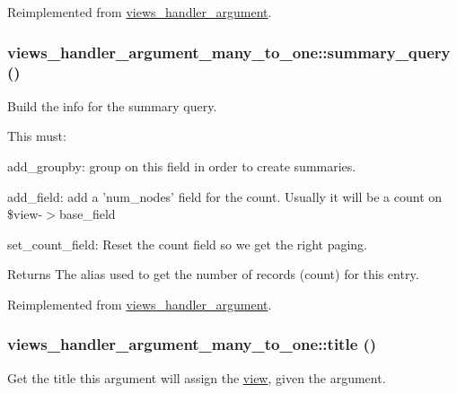 Reimplemented from \hyperlink{classviews__handler__argument_aad03acefdb44288d7e6c7793bc33f66c}{views\_\-handler\_\-argument}.\hypertarget{classviews__handler__argument__many__to__one_a320b34f2327cb15467353d2534d71ddd}{
\subsubsection[{summary\_\-query}]{\setlength{\rightskip}{0pt plus 5cm}views\_\-handler\_\-argument\_\-many\_\-to\_\-one::summary\_\-query ()}}
\label{classviews__handler__argument__many__to__one_a320b34f2327cb15467353d2534d71ddd}
Build the info for the summary query.

This must:
\begin{DoxyItemize}
\item add\_\-groupby: group on this field in order to create summaries.
\item add\_\-field: add a 'num\_\-nodes' field for the count. Usually it will be a count on \$view-\/$>$base\_\-field
\item set\_\-count\_\-field: Reset the count field so we get the right paging.
\end{DoxyItemize}

\begin{DoxyReturn}{Returns}
The alias used to get the number of records (count) for this entry. 
\end{DoxyReturn}


Reimplemented from \hyperlink{classviews__handler__argument_a1dd6cc301b1c7c1c6829c59eb641a883}{views\_\-handler\_\-argument}.\hypertarget{classviews__handler__argument__many__to__one_a624565fe59482f017f2f7935037d9297}{
\subsubsection[{title}]{\setlength{\rightskip}{0pt plus 5cm}views\_\-handler\_\-argument\_\-many\_\-to\_\-one::title ()}}
\label{classviews__handler__argument__many__to__one_a624565fe59482f017f2f7935037d9297}
Get the title this argument will assign the \hyperlink{classview}{view}, given the argument.

